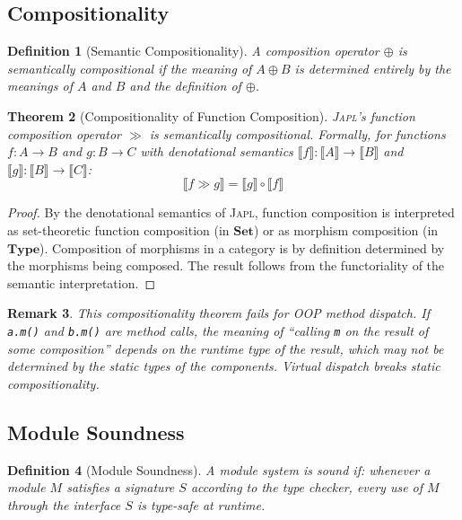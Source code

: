 \documentclass[11pt,a4paper]{article}
\newtheorem{theorem}{Theorem}[section]
\newtheorem{definition}[theorem]{Definition}
\newtheorem{remark}[theorem]{Remark}
\newcommand{\japl}{\textsc{Japl}}
\newcommand{\cat}[1]{\mathbf{#1}}
\newcommand{\Set}{\cat{Set}}
\newcommand{\Type}{\cat{Type}}
\begin{document}
\subsection{Compositionality}

\begin{definition}[Semantic Compositionality]
A composition operator $\oplus$ is \emph{semantically compositional} if the meaning of $A \oplus B$ is determined entirely by the meanings of $A$ and $B$ and the definition of $\oplus$.
\end{definition}

\begin{theorem}[Compositionality of Function Composition]
\label{thm:compositionality}
\japl{}'s function composition operator $\gg$ is semantically compositional. Formally, for functions $f : A \to B$ and $g : B \to C$ with denotational semantics $\llbracket f \rrbracket : \llbracket A \rrbracket \to \llbracket B \rrbracket$ and $\llbracket g \rrbracket : \llbracket B \rrbracket \to \llbracket C \rrbracket$:
\[
\llbracket f \gg g \rrbracket = \llbracket g \rrbracket \circ \llbracket f \rrbracket
\]
\end{theorem}

\begin{proof}
By the denotational semantics of \japl{}, function composition is interpreted as set-theoretic function composition (in $\Set$) or as morphism composition (in $\Type$). Composition of morphisms in a category is by definition determined by the morphisms being composed. The result follows from the functoriality of the semantic interpretation.
\end{proof}

\begin{remark}
This compositionality theorem fails for OOP method dispatch. If \texttt{a.m()} and \texttt{b.m()} are method calls, the meaning of ``calling \texttt{m} on the result of some composition'' depends on the runtime type of the result, which may not be determined by the static types of the components. Virtual dispatch breaks static compositionality.
\end{remark}

\subsection{Module Soundness}

\begin{definition}[Module Soundness]
A module system is \emph{sound} if: whenever a module $M$ satisfies a signature $S$ according to the type checker, every use of $M$ through the interface $S$ is type-safe at runtime.
\end{definition}
\end{document}
